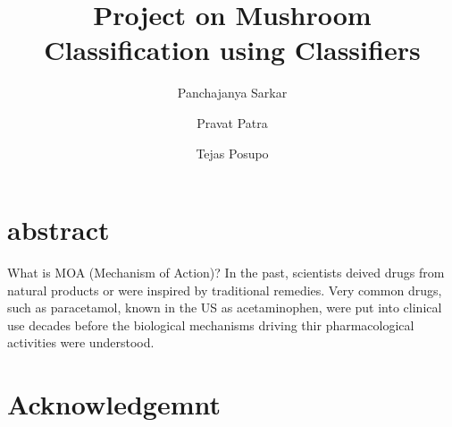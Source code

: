 \documentclass[a4paper,11pt]{article}
\title{Project on Mushroom Classification using Classifiers}
\author[a]{Panchajanya Sarkar}
\author[b]{Pravat Patra}
\author[c]{Tejas Posupo}
\affiliation[]{Central University of Rajasthan,\\
  NH-8, Ajmer, 305817, India}
\begin{document}
    \maketitle
        \section{abstract}
            What is MOA (Mechanism of Action)?
            In the past, scientists deived drugs from natural products or were inspired by traditional remedies. Very common drugs, such as paracetamol, known in the US as acetaminophen, were put into clinical use decades before the biological mechanisms driving thir pharmacological activities were understood. 
        \section{Acknowledgemnt}
\end{document}
